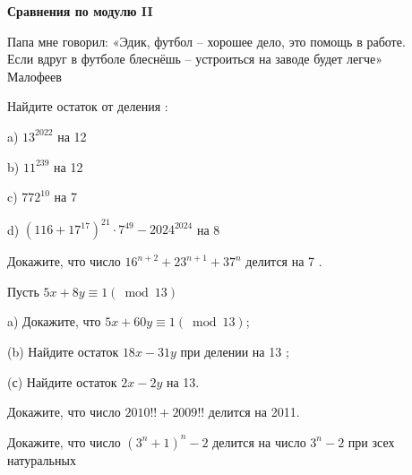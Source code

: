 \centerline{\bf \Huge Сравнения по модулю II}

\begin{flushright}
        \scriptsize{Папа мне говорил: «Эдик, футбол – хорошее дело, это помощь в работе. \\Если вдруг в футболе блеснёшь – устроиться на заводе будет легче»\\ Малофеев}
\end{flushright}

Найдите остаток от деления :

a) $13^{2022}$ на 12

b) $11^{239}$ на 12

c) $772^{10}$ на 7

d) $\left(116+17^{17}\right)^{21} \cdot 7^{49}-2024^{2024}$ на 8

Докажите, что число $16^{n+2}+23^{n+1}+37^n$ делится на 7 .

Пусть $5 x+8 y \equiv 1(\bmod 13)$

a) Докажите, что $5 x+60 y \equiv 1(\bmod 13)$;

(b) Найдите остаток $18 x- 31 y$ при делении на 13 ; 

(с) Найдите остаток $2 x-2 y$ на 13.

Докажите, что число $2010!!+2009!!$ делится на 2011.

Докажите, что число $\left(3^n+1\right)^n-2$ делится на число $3^n-2$ при зсех натуральных
